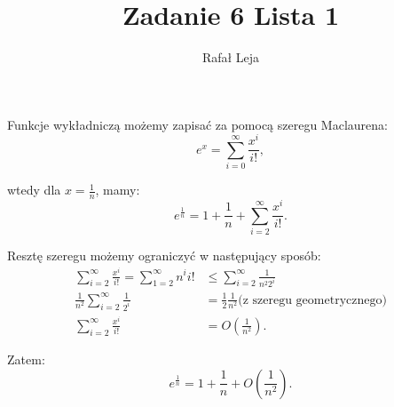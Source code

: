 \documentclass{article}
\title{Zadanie 6 Lista 1}
\author{Rafał Leja}
\theoremstyle{mytheoremstyle}
\theoremstyle{mytheoremstyle}
\theoremstyle{myproblemstyle}
\begin{document}
    \maketitle

    Funkcje wykładniczą możemy zapisać za pomocą szeregu Maclaurena:
    \[
      e^x = \sum\limits_{i = 0}^{\infty} \frac{x^i}{i!},
    \]

    wtedy dla $ x = \frac{1}{n} $, mamy:
    \[
      e^\frac{1}{n} = 1 + \frac{1}{n} + \sum\limits_{i = 2}^{\infty} \frac{x^i}{i!}.
    \]
    
    Resztę szeregu możemy ograniczyć w następujący sposób:
    \begin{align*}
      \sum\limits_{i = 2}^{\infty} \frac{x^i}{i!} = 
      \sum\limits_{1 = 2}^{\infty} n^i i! &\leq \sum\limits_{i=2}^{\infty} \frac{1}{n^2 2^i} \\
      \frac{1}{n^2} \sum\limits_{i=2}^{\infty} \frac{1}{2^i} &= \frac{1}{2} \frac{1}{n^2} \text{(z szeregu geometrycznego)} \\
      \sum\limits_{i = 2}^{\infty} \frac{x^i}{i!} &= O \left( \frac{1}{n^2} \right).
    \end{align*}

    Zatem:
    \[
     e^\frac{1}{n}  = 1 + \frac{1}{n} + O \left( \frac{1}{n^2} \right).
    \]

    
\end{document}
